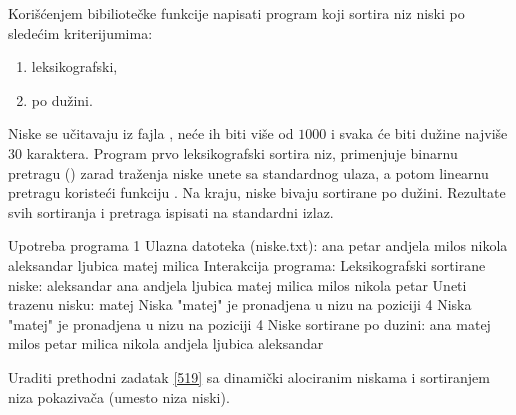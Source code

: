 \begin{Answer}[ref=518]
\end{Answer}
\begin{Exercise}[label=519]
   Korišćenjem bibiliotečke funkcije  napisati program
   koji sortira niz niski po sledećim kriterijumima:
   \begin{enumerate}
   \item leksikografski,
   \item po dužini.
   \end{enumerate}
   Niske se učitavaju iz fajla , neće ih biti više od
   $1000$ i svaka će biti dužine najviše $30$ karaktera. Program prvo
   leksikografski sortira niz, primenjuje binarnu pretragu
   () zarad traženja niske unete sa standardnog ulaza,
   a potom linearnu pretragu koristeći funkciju . Na
   kraju, niske bivaju sortirane po dužini. Rezultate svih sortiranja
   i pretraga ispisati na standardni izlaz.
   
\begin{maxitest}
\begin{test}{Upotreba programa 1}
Ulazna datoteka (niske.txt):
  ana petar andjela milos nikola aleksandar ljubica matej milica
Interakcija programa:
  Leksikografski sortirane niske:
  aleksandar ana andjela ljubica matej milica milos nikola petar 
  Uneti trazenu nisku: matej
  Niska "matej" je pronadjena u nizu na poziciji 4
  Niska "matej" je pronadjena u nizu na poziciji 4
  Niske sortirane po duzini:
  ana matej milos petar milica nikola andjela ljubica aleksandar
\end{test}
\end{maxitest}
  
\end{Exercise}

\begin{Answer}[ref=519]
\end{Answer}
\begin{Exercise}[label=520]
  Uraditi prethodni zadatak \ref{519} sa dinamički alociranim niskama
  i sortiranjem niza pokazivača (umesto niza niski).
  
\end{Exercise}

